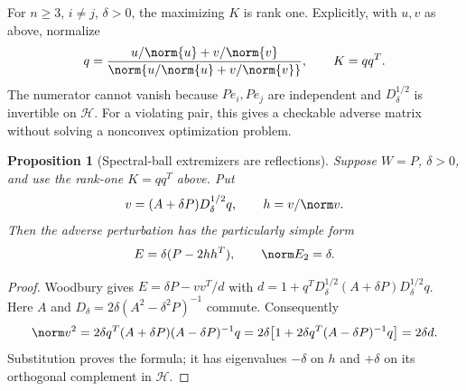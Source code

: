 \documentclass[11pt,a4paper]{article}
\newtheorem{proposition}[theorem]{Proposition}
\theoremstyle{definition}\newtheorem{definition}[theorem]{Definition}
\theoremstyle{remark}\newtheorem{remark}[theorem]{Remark}
\numberwithin{equation}{section}
\begin{document}
For $n\ge3$, $i\ne j$, $\delta>0$, the maximizing $K$ is rank one. Explicitly, with $u,v$ as above, normalize
\[
 q=\frac{u/\norm{u}+v/\norm{v}}{\norm{u/\norm{u}+v/\norm{v}}},\qquad K=qq^T.
\]
The numerator cannot vanish because $Pe_i,Pe_j$ are independent and $D_\delta^{1/2}$ is invertible on $\mathcal H$. For a violating pair, this gives a checkable adverse matrix without solving a nonconvex optimization problem.

\begin{proposition}[Spectral-ball extremizers are reflections]\label{T07-reflection}
Suppose $W=P$, $\delta>0$, and use the rank-one $K=qq^T$ above. Put
\[
 v=(A+\delta P)D_\delta^{1/2}q,\qquad h=v/\norm v.
\]
Then the adverse perturbation has the particularly simple form
\[
 E=\delta(P-2hh^T),\qquad \norm E_2=\delta.
\]
\end{proposition}
\begin{proof}
Woodbury gives $E=\delta P-vv^T/d$ with
$d=1+q^TD_\delta^{1/2}(A+\delta P)D_\delta^{1/2}q$.
Here $A$ and $D_\delta=2\delta(A^2-\delta^2P)^{-1}$ commute. Consequently
\[
 \norm v^2=2\delta q^T(A+\delta P)(A-\delta P)^{-1}q
 =2\delta\bigl[1+2\delta q^T(A-\delta P)^{-1}q\bigr]=2\delta d.
\]
Substitution proves the formula; it has eigenvalues $-\delta$ on $h$ and $+\delta$ on its orthogonal complement in $\mathcal H$.
\end{proof}
\end{document}
